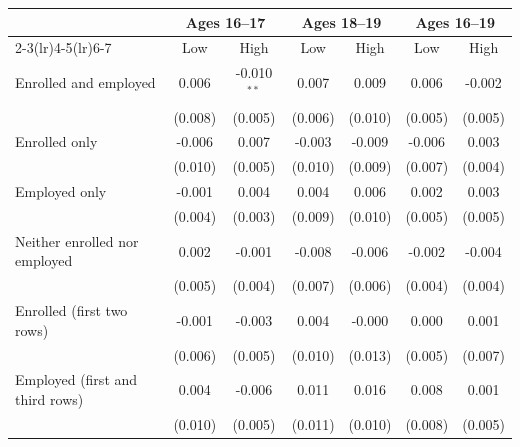 \begin{tabular}{lcccccc}
\toprule
 & \multicolumn{2}{c}{Ages 16--17} & \multicolumn{2}{c}{Ages 18--19} & \multicolumn{2}{c}{Ages 16--19} \\
\cmidrule(lr){2-3}\cmidrule(lr){4-5}\cmidrule(lr){6-7}
 & Low & High & Low & High & Low & High \\
\midrule
Enrolled and employed & 0.006 & -0.010$^{**}$ & 0.007 & 0.009 & 0.006 & -0.002 \\
 & (0.008) & (0.005) & (0.006) & (0.010) & (0.005) & (0.005) \\
Enrolled only & -0.006 & 0.007 & -0.003 & -0.009 & -0.006 & 0.003 \\
 & (0.010) & (0.005) & (0.010) & (0.009) & (0.007) & (0.004) \\
Employed only & -0.001 & 0.004 & 0.004 & 0.006 & 0.002 & 0.003 \\
 & (0.004) & (0.003) & (0.009) & (0.010) & (0.005) & (0.005) \\
Neither enrolled nor employed & 0.002 & -0.001 & -0.008 & -0.006 & -0.002 & -0.004 \\
 & (0.005) & (0.004) & (0.007) & (0.006) & (0.004) & (0.004) \\
Enrolled (first two rows) & -0.001 & -0.003 & 0.004 & -0.000 & 0.000 & 0.001 \\
 & (0.006) & (0.005) & (0.010) & (0.013) & (0.005) & (0.007) \\
Employed (first and third rows) & 0.004 & -0.006 & 0.011 & 0.016 & 0.008 & 0.001 \\
 & (0.010) & (0.005) & (0.011) & (0.010) & (0.008) & (0.005) \\
\bottomrule
\end{tabular}
